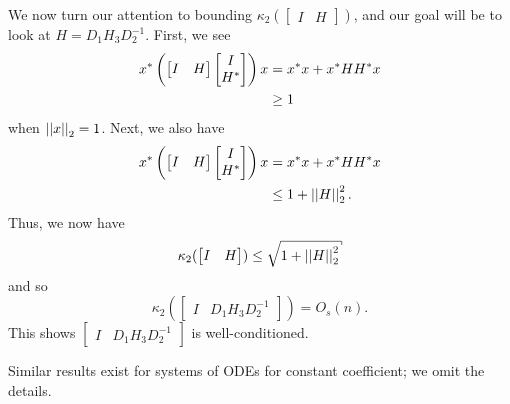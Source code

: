 We now turn our attention to bounding
$\kappa_{2}(\begin{bmatrix} I & H \end{bmatrix})$,
and our goal will be to look at $H = D_{1}H_{3}D_{2}^{-1}$.
First, we see
%
\begin{align}
    x^{*}\left( \begin{bmatrix} I & H \end{bmatrix}
        \begin{bmatrix} I \\ H^{*} \end{bmatrix} \right)x &= x^{*}x + x^{*}HH^{*}x
        \nonumber\\
    &\ge 1
\end{align}
%
when $\left| \left| x \right| \right|_{2} = 1$.
Next, we also have
%
\begin{align}
    x^{*}\left( \begin{bmatrix} I & H \end{bmatrix}
        \begin{bmatrix} I \\ H^{*} \end{bmatrix} \right)x &= x^{*}x + x^{*}HH^{*}x
        \nonumber\\
    &\le 1 + \left| \left| H \right| \right|_{2}^{2}.
\end{align}
%
Thus, we now have
%
\begin{equation}
    \kappa_{2}(\begin{bmatrix} I & H \end{bmatrix})
        \le \sqrt{1 + \norm{H}_{2}^{2}}
\end{equation}
%
and so
%
\begin{equation}
    \kappa_{2}(\begin{bmatrix} I & D_{1}H_{3}D_{2}^{-1} \end{bmatrix})
        = O_{s}(n).
\end{equation}
%
This shows $\begin{bmatrix} I & D_{1}H_{3}D_{2}^{-1} \end{bmatrix}$
is well-conditioned.

Similar results exist for systems of ODEs for constant coefficient;
we omit the details.

